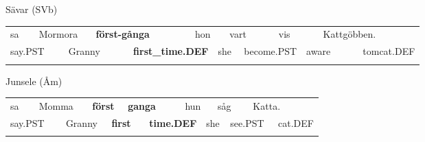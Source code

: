 \begin{styleExLtrTblii}
Sävar (SVb)

\end{styleExLtrTblii}

\begin{tabular}{llllllllllllll}
\lsptoprule
sa & \multicolumn{2}{l}{Mormora

} & \multicolumn{2}{l}{{\bfseries först-gånga}

} & \multicolumn{2}{l}{hon

} & \multicolumn{2}{l}{vart

} & \multicolumn{2}{l}{vis

} & \multicolumn{2}{l}{Kattgöbben.

} & \\
\multicolumn{2}{l}{say.PST

} & \multicolumn{2}{l}{Granny

} & \multicolumn{2}{l}{{\bfseries first\_time.DEF}

} & \multicolumn{2}{l}{she

} & \multicolumn{2}{l}{become.PST

} & \multicolumn{2}{l}{aware

} & \multicolumn{2}{l}{tomcat.DEF

}\\
\lspbottomrule
\end{tabular}

\begin{styleExLtrTblii}
Junsele (Åm)

\end{styleExLtrTblii}

\begin{tabular}{llllllllllllll}
\lsptoprule
sa & \multicolumn{2}{l}{Momma

} & \multicolumn{2}{l}{{\bfseries först}

} & \multicolumn{2}{l}{{\bfseries ganga}

} & \multicolumn{2}{l}{hun

} & \multicolumn{2}{l}{såg

} & \multicolumn{2}{l}{Katta.

} & \\
\multicolumn{2}{l}{say.PST

} & \multicolumn{2}{l}{Granny

} & \multicolumn{2}{l}{{\bfseries first}

} & \multicolumn{2}{l}{{\bfseries time.DEF}

} & \multicolumn{2}{l}{she

} & \multicolumn{2}{l}{see.PST

} & \multicolumn{2}{l}{cat.DEF

}\\
\lspbottomrule
\end{tabular}

